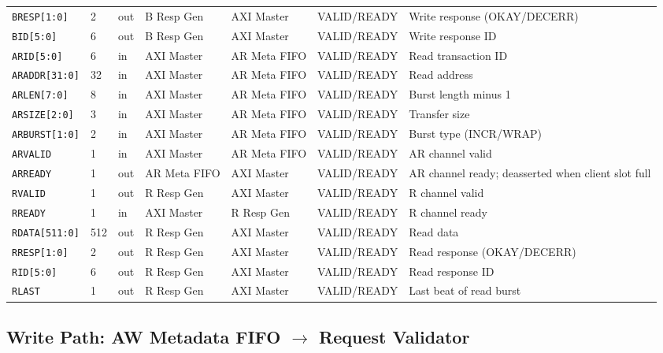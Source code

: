 \documentclass[11pt,a4paper]{article}
\begin{document}
\begin{landscape}
\begin{tabularx}{\linewidth}{L{3.0cm} C{0.8cm} C{1.0cm} L{2.2cm} L{2.2cm} L{3.4cm} X}
\texttt{BRESP[1:0]}    & 2   & out & B Resp Gen  & AXI Master  & VALID/READY & Write response (OKAY/DECERR) \\
\texttt{BID[5:0]}      & 6   & out & B Resp Gen  & AXI Master  & VALID/READY & Write response ID \\
\midrule
\texttt{ARID[5:0]}     & 6   & in  & AXI Master & AR Meta FIFO & VALID/READY & Read transaction ID \\
\texttt{ARADDR[31:0]}  & 32  & in  & AXI Master & AR Meta FIFO & VALID/READY & Read address \\
\texttt{ARLEN[7:0]}    & 8   & in  & AXI Master & AR Meta FIFO & VALID/READY & Burst length minus 1 \\
\texttt{ARSIZE[2:0]}   & 3   & in  & AXI Master & AR Meta FIFO & VALID/READY & Transfer size \\
\texttt{ARBURST[1:0]}  & 2   & in  & AXI Master & AR Meta FIFO & VALID/READY & Burst type (INCR/WRAP) \\
\texttt{ARVALID}       & 1   & in  & AXI Master & AR Meta FIFO & VALID/READY & AR channel valid \\
\texttt{ARREADY}       & 1   & out & AR Meta FIFO & AXI Master & VALID/READY & AR channel ready; deasserted when client slot full \\
\midrule
\texttt{RVALID}        & 1   & out & R Resp Gen  & AXI Master  & VALID/READY & R channel valid \\
\texttt{RREADY}        & 1   & in  & AXI Master  & R Resp Gen  & VALID/READY & R channel ready \\
\texttt{RDATA[511:0]}  & 512 & out & R Resp Gen  & AXI Master  & VALID/READY & Read data \\
\texttt{RRESP[1:0]}    & 2   & out & R Resp Gen  & AXI Master  & VALID/READY & Read response (OKAY/DECERR) \\
\texttt{RID[5:0]}      & 6   & out & R Resp Gen  & AXI Master  & VALID/READY & Read response ID \\
\texttt{RLAST}         & 1   & out & R Resp Gen  & AXI Master  & VALID/READY & Last beat of read burst \\
\bottomrule
\end{tabularx}

\subsection{Write Path: AW Metadata FIFO $\rightarrow$ Request Validator}


\end{landscape}
\end{document}
